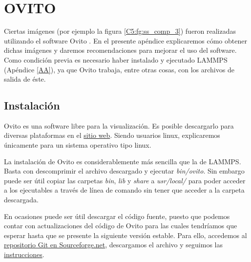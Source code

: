 
\chapter{OVITO} %

\label{AB} %


Ciertas imágenes (por ejemplo la figura \ref{C5:fg:ss_comp_3}) fueron realizadas utilizando el software Ovito \citep{stukowski10}. En el presente apéndice explicaremos cómo obtener dichas imágenes y daremos recomendaciones para mejorar el uso del software. Como condición previa es necesario haber instalado y ejecutado LAMMPS (Apéndice \ref{AA}), ya que Ovito trabaja, entre otras cosas, con los archivos de salida de éste.

\section{Instalación}
\label{AB_1}

Ovito es una software libre para la visualización. Es posible descargarlo para diversas plataformas en el \href{http://www.ovito.org/index.php/download}{sitio web}. Siendo usuarios linux, explicaremos únicamente para un sistema operativo tipo linux.

La instalación de Ovito es considerablemente más sencilla que la de LAMMPS. Basta con descomprimir el archivo descargado y ejecutar \textit{bin/ovito}. Sin embargo puede ser útil copiar las carpetas \textit{bin}, \textit{lib} y \textit{share} a \textit{usr/local/} para poder acceder a los ejecutables a través de línea de comando sin tener que acceder a la carpeta descargada.

En ocasiones puede ser útil descargar el código fuente, puesto que podemos contar con actualizaciones del código de Ovito para las cuales tendríamos que esperar hasta que se presente la siguiente versión estable. Para ello, accedemos al \href{http://sourceforge.net/p/ovito/git/ci/master/tree/}{repositorio Git en Sourceforge.net}, descargamos el archivo y seguimos las \href{http://www.ovito.org/manual/development.build_linux.html}{instrucciones}.

